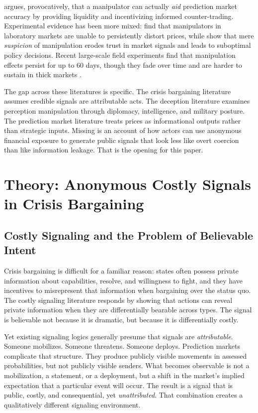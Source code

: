 \documentclass[12pt]{article}
\begin{document}
\citet{hanson2009} argues, provocatively, that a manipulator can actually \textit{aid} prediction market accuracy by providing liquidity and incentivizing informed counter-trading. Experimental evidence has been more mixed: \citet{hanson2006} find that manipulators in laboratory markets are unable to persistently distort prices, while \citet{dekkerseidl2023} show that mere \textit{suspicion} of manipulation erodes trust in market signals and leads to suboptimal policy decisions. Recent large-scale field experiments find that manipulation effects persist for up to 60 days, though they fade over time and are harder to sustain in thick markets \citep{manipulability2025}.

The gap across these literatures is specific. The crisis bargaining literature assumes credible signals are attributable acts. The deception literature examines perception manipulation through diplomacy, intelligence, and military posture. The prediction market literature treats prices as informational outputs rather than strategic inputs. Missing is an account of how actors can use anonymous financial exposure to generate public signals that look less like overt coercion than like information leakage. That is the opening for this paper.


\section{Theory: Anonymous Costly Signals in Crisis Bargaining}\label{sec:theory}

\subsection{Costly Signaling and the Problem of Believable Intent}

Crisis bargaining is difficult for a familiar reason: states often possess private information about capabilities, resolve, and willingness to fight, and they have incentives to misrepresent that information when bargaining over the status quo. The costly signaling literature responds by showing that actions can reveal private information when they are differentially bearable across types. The signal is believable not because it is dramatic, but because it is differentially costly.

Yet existing signaling logics generally presume that signals are \textit{attributable}. Someone mobilizes. Someone threatens. Someone deploys. Prediction markets complicate that structure. They produce publicly visible movements in assessed probabilities, but not publicly visible senders. What becomes observable is not a mobilization, a statement, or a deployment, but a shift in the market's implied expectation that a particular event will occur. The result is a signal that is public, costly, and consequential, yet \textit{unattributed}. That combination creates a qualitatively different signaling environment.
\end{document}
